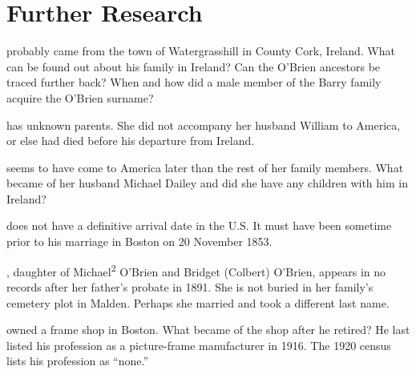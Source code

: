 \chapter{Further Research}

 probably came from the town of Watergrasshill in County Cork, Ireland. What can be found out about his family in Ireland? Can the O'Brien ancestors be traced further back? When and how did a male member of the Barry family acquire the O'Brien surname?

 has unknown parents. She did not accompany her husband William to America, or else had died before his departure from Ireland. 

 seems to have come to America later than the rest of her family members. What became of her husband Michael Dailey and did she have any children with him in Ireland?

 does not have a definitive arrival date in the U.S. It must have been sometime prior to his marriage in Boston on 20 November 1853.

, daughter of Michael\textsuperscript{2} O'Brien and Bridget (Colbert) O'Brien, appears in no records after her father's probate in 1891. She is not buried in her family's cemetery plot in Malden. Perhaps she married and took a different last name.

 owned a frame shop in Boston. What became of the shop after he retired? He last listed his profession as a picture-frame manufacturer in 1916. The 1920 census lists his profession as ``none.''\cite{John3OBrien1916}